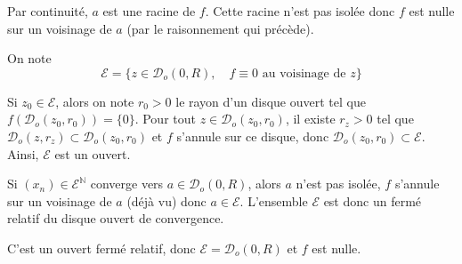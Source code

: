 Par continuité, $a$ est une racine de $f$. Cette racine n'est pas isolée donc $f$ est nulle sur un voisinage de $a$ (par le raisonnement qui précède).

On note \[
    \mathcal E=\{z\in \mathcal  D_o(0,R), \quad f\equiv 0\text{ au voisinage de }z\}
\]

Si $z_0\in \mathcal E$, alors on note $r_0>0$ le rayon d'un disque ouvert tel que $f(\mathcal D_o(z_0,r_0))=\{0\}$. Pour tout $z\in \mathcal D_o(z_0, r_0)$, il existe $r_z>0$ tel que $\mathcal D_o(z,r_z)\subset \mathcal D_o(z_0,r_0)$ et $f$ s'annule sur ce disque, donc $\mathcal D_o(z_0, r_0)\subset \mathcal E$. Ainsi, $\mathcal E$ est un ouvert.

Si $(x_n)\in \mathcal E^{\mathbb N}$ converge vers $a\in \mathcal D_o(0, R)$, alors $a$ n'est pas isolée, $f$ s'annule sur un voisinage de $a$ (déjà vu) donc $a\in \mathcal E$. L'ensemble $\mathcal E$ est donc un fermé relatif du disque ouvert de convergence.

C'est un ouvert fermé relatif, donc $\mathcal E=\mathcal D_o(0, R)$ et $f$ est nulle.
